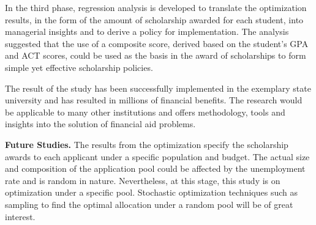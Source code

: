 \documentclass[12pt,english]{report}
\begin{document}
In the third phase, regression analysis is developed to translate the optimization results, in the form of the  amount of scholarship awarded for each student, into managerial insights and to derive a policy for implementation.  The analysis suggested that the use of a composite score, derived based on the student's GPA and ACT scores, could be used as the basis in the award of scholarships to form simple yet effective scholarship policies.

The result of the study has been successfully implemented in the exemplary state university and has resulted in millions of financial benefits.  The research would be applicable to many other institutions and offers methodology, tools and insights into the solution of financial aid problems. 

\noindent \textbf{Future Studies.}
The results from the optimization specify the scholarship awards to each applicant under a specific population and budget.  The actual size and composition of the application pool could be affected by the unemployment rate and is random in nature.  Nevertheless, at this stage, this study is on optimization under a specific pool.  Stochastic optimization techniques such as sampling  to find the optimal allocation under a random pool will be of great interest. 

\end{document}
